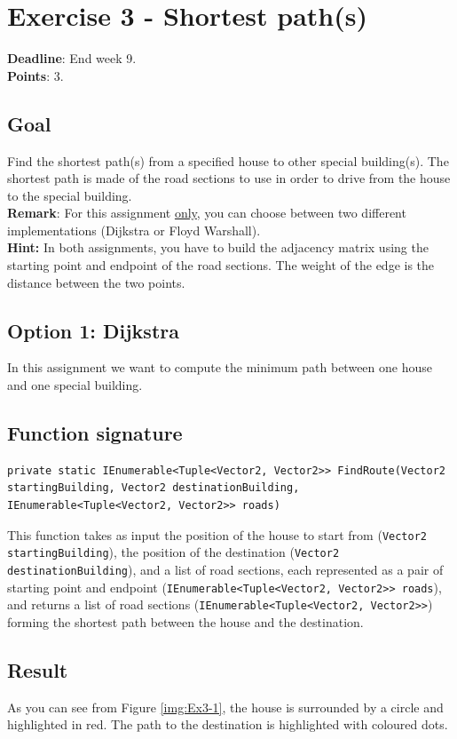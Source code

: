 \documentclass[10pt,a4paper]{article}
\begin{document}
\section*{Exercise 3 - Shortest path(s)}
\textbf{Deadline}: End week 9. \\
\textbf{Points}: 3.


\subsection*{Goal}
Find the shortest path(s) from a specified house to other special building(s). The shortest path is made of the road sections to use in order to drive from the house to the special building.\\
\textbf{Remark}: For this assignment \underline{only}, you can choose between two different implementations (Dijkstra or Floyd Warshall).\\
\textbf{Hint:} In both assignments, you have to build the adjacency matrix using the starting point and endpoint of the road sections. The weight of the edge is the distance between the two points.

\subsection*{Option 1: Dijkstra}
In this assignment we want to compute the minimum path between one house and one special building. 

\subsection*{Function signature} 
\begin{lstlisting}
private static IEnumerable<Tuple<Vector2, Vector2>> FindRoute(Vector2 startingBuilding, Vector2 destinationBuilding, IEnumerable<Tuple<Vector2, Vector2>> roads)
\end{lstlisting}

\noindent
This function takes as input the position of the house to start from (\texttt{Vector2 startingBuilding}), the position of the destination (\texttt{Vector2 destinationBuilding}), and a list of road sections, each represented as a pair of starting point and endpoint (\texttt{IEnumerable<Tuple<Vector2, Vector2>> roads}), and returns a list of road sections (\texttt{IEnumerable<Tuple<Vector2, Vector2>>}) forming the shortest path between the house and the destination.\\

\subsection*{Result} 
As you can see from Figure \ref{img:Ex3-1}, the house is surrounded by a circle and highlighted in red. The path to the destination is highlighted with coloured dots.
\end{document}
